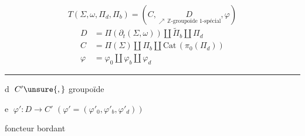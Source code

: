 \[
 T(\Sigma,\omega,\Pi_d,\Pi_b)=(C,\underset{\nearrow\,\mathbb Z\text{-groupoïde }1\text{-spécial}}{D},\varphi)
\]
\[
\begin{aligned}
D&=\Pi(\partial_t(\Sigma,\omega))\amalg\widetilde\Pi_b\amalg\Pi_d\\
C&=\Pi(\Sigma)\amalg\Pi_b\amalg\mathrm{Cat}\,(\pi_0(\Pi_d))\\
\varphi&=\varphi_0\amalg\varphi_b\amalg\varphi_d
\end{aligned}
\]

\noindent\rule{\linewidth}{.4pt}

\textcircled{d} $C'\unsure{,}$ groupoïde

\textcircled{e} $\varphi':D\longrightarrow C'$ \qquad $(\varphi'=(\varphi'_0,\varphi'_b,\varphi'_d))$

\hspace{3em}foncteur bordant
